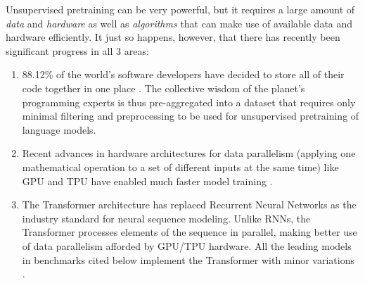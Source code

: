 Unsupervised pretraining can be very powerful, but it requires a large amount of \emph{data} and \emph{hardware} as well as \emph{algorithms} that can make use of available data and hardware efficiently. 
It just so happens, however, that there has recently been significant progress in all 3 areas:
\begin{enumerate}
    \item 88.12\% of the world's software developers have decided to store all of their code together in one place \cite{GithubMarketShare}. The collective wisdom of the planet's programming experts is thus pre-aggregated into a dataset that requires only minimal filtering and preprocessing \cite{kocetkovStack3TB2022} to be used for unsupervised pretraining of language models.
    \item Recent advances in hardware architectures for data parallelism (applying one mathematical operation to a set of different inputs at the same time) like GPU \cite{dallyEvolutionGraphicsProcessing2021} and TPU \cite{jouppiMotivationEvaluationFirst2018} have enabled much faster model training \cite{wangBenchmarkingTPUGPU2019}. 
    \item The Transformer architecture \cite{vaswaniAttentionAllYou2023} has replaced Recurrent Neural Networks \cite{hochreiterLongShorttermMemory1997,choPropertiesNeuralMachine2014} as the industry standard for neural sequence modeling. Unlike RNNs, the Transformer processes elements of the sequence in parallel, making better use of data parallelism afforded by GPU/TPU hardware. All the leading models in benchmarks cited below implement the Transformer with minor variations \cite{raffelExploringLimitsTransfer2023, wangGrokkedTransformersAre2024, geipingCrammingTrainingLanguage2022, liuBetterFewShotFinetuning2023, liuSwinTransformerV22022, rabeSelfattentionDoesNot2022, soPrimerSearchingEfficient2022, sunLengthExtrapolatableTransformer2022, xieResiDualTransformerDual2023, burtsevMemoryTransformer2021a, dingCogViewMasteringTexttoImage2021, dingERNIEDocRetrospectiveLongDocument2021, henryQueryKeyNormalizationTransformers2020, heRealFormerTransformerLikes2021, huangAttentionAttentionImage2019, luUnderstandingImprovingTransformer2019, nguyenTransformersTearsImproving2019, parisottoStabilizingTransformersReinforcement2019, PathwaysLanguageModel, pressImprovingTransformerModels2020, pressTRAINSHORTTEST2022, shazeerFastTransformerDecoding2019, shazeerGLUVariantsImprove2020, shazeerTalkingHeadsAttention2020, shleiferNormFormerImprovedTransformer2021, sukhbaatarAugmentingSelfattentionPersistent2019a, wangCrossFormerVersatileVision2021, zhangRootMeanSquare2019, zhaoExplicitSparseTransformer2019, ZhiXuJiXingDaiMaGaiJinTransformerZiZhuYiLiJiZhiJiHuBuZengJiaJiSuanLiang}.
\end{enumerate}

